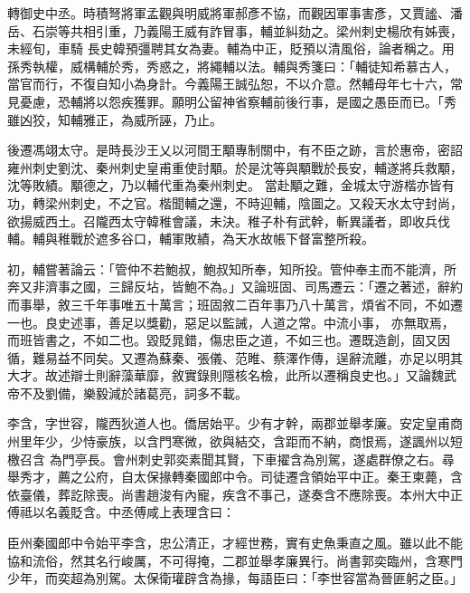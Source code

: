 \begin{pinyinscope}
 轉御史中丞。時積弩將軍孟觀與明威將軍郝彥不協，而觀因軍事害彥，又賈謐、潘岳、石崇等共相引重，乃義陽王威有詐冒事，輔並糾劾之。梁州刺史楊欣有姊喪，未經旬，車騎
 長史韓預彊聘其女為妻。輔為中正，貶預以清風俗，論者稱之。用孫秀執權，威構輔於秀，秀惑之，將繩輔以法。輔與秀箋曰：「輔徒知希慕古人，當官而行，不復自知小為身計。今義陽王誠弘恕，不以介意。然輔母年七十六，常見憂慮，恐輔將以怨疾獲罪。願明公留神省察輔前後行事，是國之愚臣而已。「秀雖凶狡，知輔雅正，為威所誣，乃止。



 後遷馮翊太守。是時長沙王乂以河間王顒專制關中，有不臣之跡，言於惠帝，密詔雍州刺史劉沈、秦州刺史皇甫重使討顒。於是沈等與顒戰於長安，輔遂將兵救顒，沈等敗績。顒德之，乃以輔代重為秦州刺史。
 當赴顒之難，金城太守游楷亦皆有功，轉梁州刺史，不之官。楷聞輔之還，不時迎輔，陰圖之。又殺天水太守封尚，欲揚威西土。召隴西太守韓稚會議，未決。稚子朴有武幹，斬異議者，即收兵伐輔。輔與稚戰於遮多谷口，輔軍敗績，為天水故帳下督富整所殺。



 初，輔嘗著論云：「管仲不若鮑叔，鮑叔知所奉，知所投。管仲奉主而不能濟，所奔又非濟事之國，三歸反坫，皆鮑不為。」又論班固、司馬遷云：「遷之著述，辭約而事舉，敘三千年事唯五十萬言；班固敘二百年事乃八十萬言，煩省不同，不如遷一也。良史述事，善足以獎勸，惡足以監誡，人道之常。中流小事，
 亦無取焉，而班皆書之，不如二也。毀貶晁錯，傷忠臣之道，不如三也。遷既造創，固又因循，難易益不同矣。又遷為蘇秦、張儀、范睢、蔡澤作傳，逞辭流離，亦足以明其大才。故述辯士則辭藻華靡，敘實錄則隱核名檢，此所以遷稱良史也。」又論魏武帝不及劉備，樂毅減於諸葛亮，詞多不載。



 李含，字世容，隴西狄道人也。僑居始平。少有才幹，兩郡並舉孝廉。安定皇甫商州里年少，少恃豪族，以含門寒微，欲與結交，含距而不納，商恨焉，遂諷州以短檄召含
 為門亭長。會州刺史郭奕素聞其賢，下車擢含為別駕，遂處群僚之右。尋舉秀才，薦之公府，自太保掾轉秦國郎中令。司徒遷含領始平中正。秦王柬薨，含依臺儀，葬訖除喪。尚書趙浚有內寵，疾含不事己，遂奏含不應除喪。本州大中正傅祗以名義貶含。中丞傅咸上表理含曰：



 臣州秦國郎中令始平李含，忠公清正，才經世務，實有史魚秉直之風。雖以此不能協和流俗，然其名行峻厲，不可得掩，二郡並舉孝廉異行。尚書郭奕臨州，含寒門少年，而奕超為別駕。太保衛瓘辟含為掾，每語臣曰：「李世容當為晉匪躬之臣。」




\end{pinyinscope}
